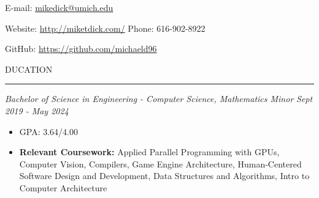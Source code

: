 \documentclass[11pt]{article}
\begin{document}
 \hfill E-mail: {\color{black}\url{ mikedick@umich.edu}}
\par Website: \url{http://miketdick.com/} \hfill Phone: 616-902-8922
\par GitHub: \url{https://github.com/michaeld96}
\vspace*{0.1cm}
\par \scalebox{1.3}{E}DUCATION                    
\par \vspace{-0.1in} \noindent\rule{7.8in}{0.5pt} 
\textbf{\scalebox{1.2}{University of Michigan - Ann Arbor}}
\par \textit{Bachelor of Science in Engineering - Computer Science, Mathematics Minor} \hfill \textit{Sept 2019 - May 2024}
{\small 

\begin{itemize}
    \item GPA: 3.64/4.00
    \item \textbf{Relevant Coursework:} Applied Parallel Programming with GPUs, Computer Vision, Compilers, Game Engine Architecture, 
    Human-Centered Software Design and Development, Data Structures and Algorithms, Intro to Computer Architecture
\end{itemize}
}
\end{document}

